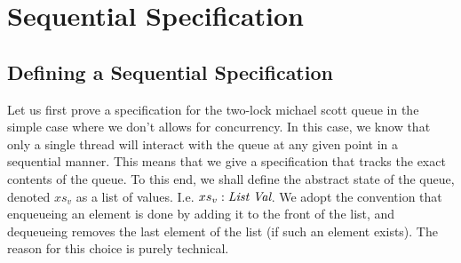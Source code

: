 \documentclass[a4paper, 11pt]{report}
\newcommand{\acquire}{\operatorname{acquire}}
\newcommand{\release}{\operatorname{release}}
\newcommand{\enqueue}{\operatorname{enqueue}}
\newcommand{\dequeue}{\operatorname{dequeue}}
\begin{document}



\chapter{Sequential Specification}
\label{ch:TLMSQSEQ}

\section{Defining a Sequential Specification}
\label{TLMSQSEQ:section:sequential-spec}

Let us first prove a specification for the two-lock michael scott queue in the simple case where we don't allows for concurrency. In this case, we know that only a single thread will interact with the queue at any given point in a sequential manner. This means that we give a specification that tracks the exact contents of the queue. To this end, we shall define the abstract state of the queue, denoted $xs_v$ as a list of \heaplang values. I.e. $xs_v : \List \ \Val$. We adopt the convention that enqueueing an element is done by adding it to the front of the list, and dequeueing removes the last element of the list (if such an element exists). The reason for this choice is purely technical.
\end{document}
